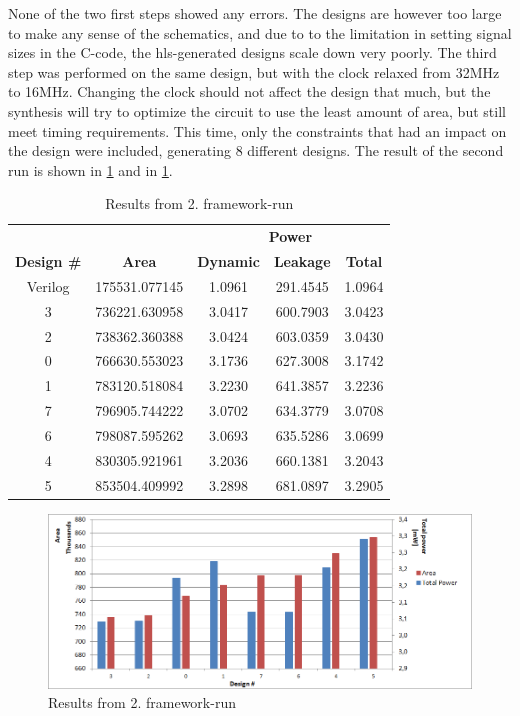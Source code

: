 None of the two first steps showed any errors. The designs are however too large to make any sense of the schematics, and due to to the limitation in setting signal sizes in the C-code, the \gls{hls}-generated designs scale down very poorly. The third step was performed on the same design, but with the clock relaxed from 32MHz to 16MHz. Changing the clock should not affect the design that much, but the synthesis will try to optimize the circuit to use the least amount of area, but still meet timing requirements. This time, only the constraints that had an impact on the design were included, generating 8 different designs. The result of the second run is shown in \cref{tab:resultgraphframeworkrun2} and in \cref{fig:resultgraphframeworkrun2}.
\begin{table}[hbtp]
    \centering
    \begin{tabular}{ccccc}
    & & \multicolumn{3}{c}{\textbf{Power}} \\
    \cline{3-5}
    \textbf{Design \#} & \textbf{Area} & \textbf{Dynamic} & \textbf{Leakage} & \textbf{Total} \\
    \toprule
    Verilog & 175531.077145 & 1.0961 & 291.4545 & 1.0964 \\
    3 & 736221.630958 & 3.0417 & 600.7903 & 3.0423 \\
    2 & 738362.360388 & 3.0424 & 603.0359 & 3.0430 \\
    0 & 766630.553023 & 3.1736 & 627.3008 & 3.1742 \\
    1 & 783120.518084 & 3.2230 & 641.3857 & 3.2236 \\
    7 & 796905.744222 & 3.0702 & 634.3779 & 3.0708 \\
    6 & 798087.595262 & 3.0693 & 635.5286 & 3.0699 \\
    4 & 830305.921961 & 3.2036 & 660.1381 & 3.2043 \\
    5 & 853504.409992 & 3.2898 & 681.0897 & 3.2905 \\

    \bottomrule
    \end{tabular}
    \caption{Results from 2. framework-run}
    \label{tab:resultgraphframeworkrun2}
\end{table}

\begin{figure}[hbpt]
\centering
\includegraphics[width=\textwidth]{../figs/resultGraph2.png}
\caption{\label{fig:resultgraphframeworkrun2}Results from 2. framework-run}
\end{figure}

